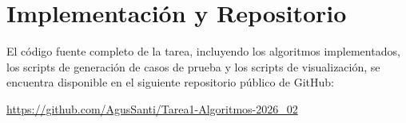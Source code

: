 \section{Implementación y Repositorio}
\label{sec:implementacion}

El código fuente completo de la tarea, incluyendo los algoritmos implementados, los scripts de generación de casos de prueba y los scripts de visualización, se encuentra disponible en el siguiente repositorio público de GitHub:

\begin{center}
    \url{https://github.com/AgusSanti/Tarea1-Algoritmos-2026_02}
\end{center}
